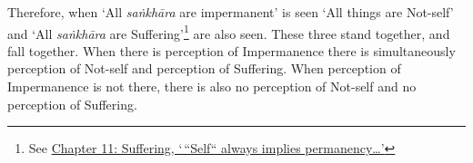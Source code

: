 Therefore, when `All \textit{saṅkhāra} are impermanent' is seen `All things are Not-self' and `All \textit{saṅkhāra} are Suffering'\footnote{See \href{ch-11-suffering.xml\#impermanent}{Chapter 11: Suffering, `\,``Self`` always implies permanency\ldots\hspace{0pt}'}} are also seen. These three stand together, and fall together. When there is perception of Impermanence there is simultaneously perception of Not-self and perception of Suffering. When perception of Impermanence is not there, there is also no perception of Not-self and no perception of Suffering.
